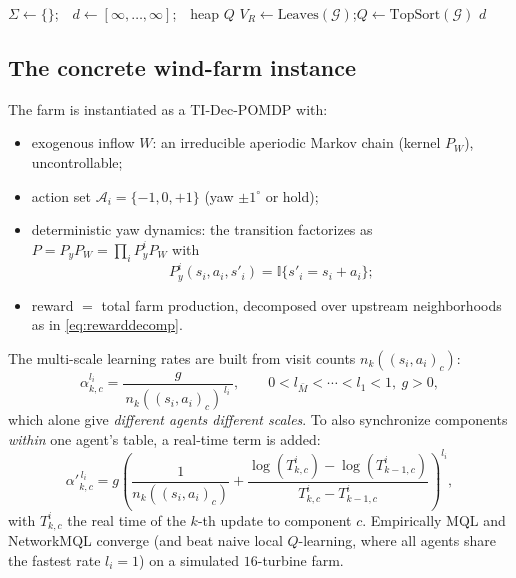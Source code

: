 \documentclass[11pt]{article}
\theoremstyle{plain}
\theoremstyle{definition}
\newcommand{\calA}{\mathcal{A}}
\newcommand{\calG}{\mathcal{G}}
\begin{document}
\begin{algorithm}[h]
\SetAlgoLined
\KwIn{DAG $\calG=(V,E)$ with $M$ nodes}
$\Sigma\leftarrow\{\}$;\ \ $d\leftarrow[\infty,\dots,\infty]$;\ \ heap $Q$\;
$V_R\leftarrow \mathrm{Leaves}(\calG)$;\quad $Q\leftarrow\mathrm{TopSort}(\calG)$\;
\Return $d$\;
\caption{Learning-rate level attribution for any DAG (\cite{P2}, App.\ A.6)}
\label{alg:lr}
\end{algorithm}

\subsection{The concrete wind-farm instance}

The farm is instantiated as a TI-Dec-POMDP with:
\begin{itemize}[leftmargin=1.4em,itemsep=1pt]
  \item exogenous inflow $W$: an irreducible aperiodic Markov chain (kernel
  $P_W$), uncontrollable;
  \item action set $\calA_i=\{-1,0,+1\}$ (yaw $\pm 1^\circ$ or hold);
  \item deterministic yaw dynamics: the transition factorizes as
  $P=P_y P_W=\prod_i P^i_y P_W$ with
  \begin{equation}
    P^i_y(s_i,a_i,s'_i) = \mathbb{I}\{s'_i = s_i + a_i\};
  \end{equation}
  \item reward $=$ total farm production, decomposed over upstream neighborhoods
  as in \eqref{eq:rewarddecomp}.
\end{itemize}
The multi-scale learning rates are built from visit counts
$n_k((s_i,a_i)_c)$:
\begin{equation}
  \alpha^{l_i}_{k,c}
  = \frac{g}{\,n_k((s_i,a_i)_c)^{\,l_i}\,},
  \qquad 0<l_{\bar M}<\cdots<l_1<1,\ g>0,
\end{equation}
which alone give \emph{different agents different scales}. To also synchronize
components \emph{within} one agent's table, a real-time term is added:
\begin{equation}
  \alpha'^{\,l_i}_{k,c}
  = g\left(\frac{1}{n_k((s_i,a_i)_c)}
    + \frac{\log(T^i_{k,c}) - \log(T^i_{k-1,c})}{T^i_{k,c} - T^i_{k-1,c}}\right)^{\!l_i},
\end{equation}
with $T^i_{k,c}$ the real time of the $k$-th update to component $c$.
Empirically MQL and NetworkMQL converge (and beat naive local $Q$-learning,
where all agents share the fastest rate $l_i=1$) on a simulated $16$-turbine
farm.
\end{document}
